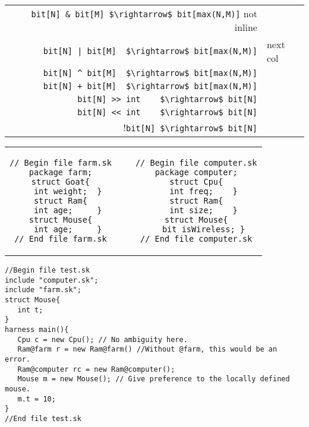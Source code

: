 
\begin{tabular}{r}
\lstinline!bit[N] & bit[M] $\rightarrow$ bit[max(N,M)]! not inline \\
\lstinline!bit[N] | bit[M]  $\rightarrow$ bit[max(N,M)]! & next col \\
\lstinline!bit[N] ^ bit[M]  $\rightarrow$ bit[max(N,M)]!\\
\lstinline!bit[N] + bit[M]  $\rightarrow$ bit[max(N,M)]!\\
\lstinline!bit[N] >> int    $\rightarrow$ bit[N]!\\
\lstinline!bit[N] << int    $\rightarrow$ bit[N]!\\
!\lstinline!bit[N] $\rightarrow$ bit[N]!\\
\end{tabular}

\begin{tabular}{cp{2cm}c}
\begin{lstlisting}
// Begin file farm.sk
package farm;
struct Goat{
   int weight;  }
struct Ram{
   int age;     }
struct Mouse{
   int age;     }
// End file farm.sk
\end{lstlisting} & ~ &
\begin{lstlisting}
// Begin file computer.sk
package computer;
struct Cpu{
   int freq;    }
struct Ram{
   int size;    }
struct Mouse{
   bit isWireless; }
// End file computer.sk
\end{lstlisting}
\end{tabular}
\begin{lstlisting}
//Begin file test.sk
include "computer.sk";
include "farm.sk";
struct Mouse{
   int t;  
}
harness main(){
   Cpu c = new Cpu(); // No ambiguity here.
   Ram@farm r = new Ram@farm() //Without @farm, this would be an error.
   Ram@computer rc = new Ram@computer();
   Mouse m = new Mouse(); // Give preference to the locally defined mouse.
   m.t = 10;
}
//End file test.sk
\end{lstlisting}